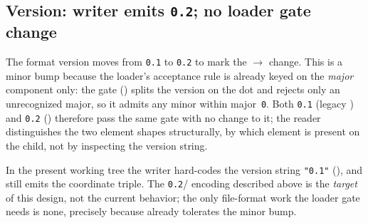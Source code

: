 \subsection{Version: writer emits \texttt{0.2}; no loader gate change}

The format version moves from \texttt{0.1} to \texttt{0.2} to mark the
$\rightarrow$ change. This is a minor bump because the
loader's acceptance rule is already keyed on the \emph{major} component only: the gate
() splits the version on the dot and rejects only an
unrecognized major, so it admits any minor within major~\texttt{0}. Both \texttt{0.1}
(legacy ) and \texttt{0.2} () therefore pass the same gate
with no change to it; the reader distinguishes the two element shapes structurally, by
which element is present on the child, not by inspecting the version string.

\begin{hardfail}
In the present working tree the writer hard-codes the version string \texttt{"0.1"}
(), and  still emits the
coordinate triple. The \texttt{0.2}/ encoding described above is the
\emph{target} of this design, not the current behavior; the only file-format work the
loader gate needs is none, precisely because 
already tolerates the minor bump.
\end{hardfail}
